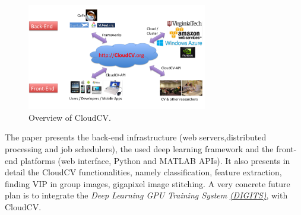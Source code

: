\begin{figure}[H]
\begin{center}
\includegraphics[width=0.7\textwidth]{fig/CloudCV}
\end{center}
\caption{Overview of CloudCV.}
\label{fig:cloudcv}
\end{figure}

The paper presents the back-end infrastructure (web servers,distributed processing and job schedulers), the used deep learning framework and the front-end platforms (web interface, Python and MATLAB APIs). It also presents in detail the CloudCV functionalities, namely classification, feature extraction, finding VIP in group images, gigapixel image stitching. A very concrete future plan is to integrate the {\em Deep Learning GPU Training System} \href{https://developer.nvidia.com/digits}{\underline{\em (DIGITS)}}, \cite{digits_soft} with CloudCV. 